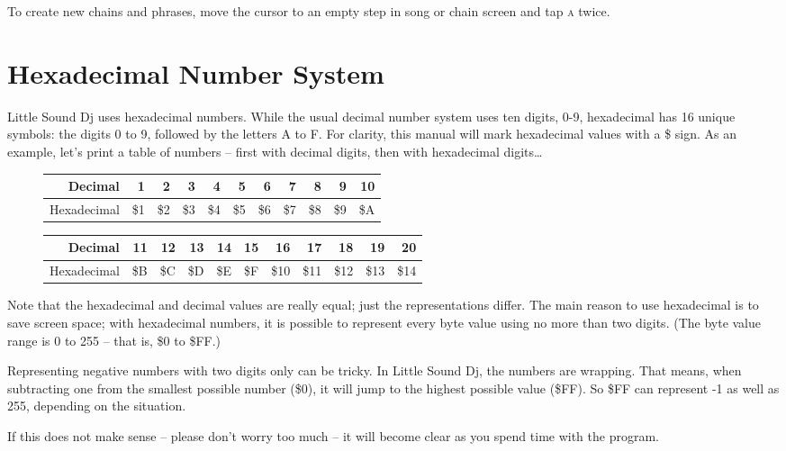 To create new chains and phrases, move the cursor to an empty step in song or chain screen and tap \textsc{a} twice.

\section{Hexadecimal Number System}

Little Sound Dj uses hexadecimal numbers. While the usual decimal number system uses ten digits, 0-9, hexadecimal has 16 unique symbols: the digits 0 to 9, followed by the letters A to F. For clarity, this manual will mark hexadecimal values with a \$ sign.
As an example, let's print a table of numbers -- first with decimal digits, then with
hexadecimal digits\ldots

\begin{figure}[hbtp]
\centering

\begin{tabular}{r|r|r|r|r|r|r|r|r|r|r}
 Decimal & 1 & 2 & 3 & 4 & 5 & 6 & 7 & 8 & 9 & 10 \\
\hline
 Hexadecimal & \$1 & \$2 & \$3 & \$4 & \$5 & \$6 & \$7 & \$8 & \$9 & \$A \\
\end{tabular}

\begin{tabular}{r|r|r|r|r|r|r|r|r|r|r}
 Decimal & 11 & 12 & 13 & 14 & 15 & 16 & 17 & 18 & 19 & 20 \\
\hline
 Hexadecimal & \$B & \$C & \$D & \$E & \$F & \$10 & \$11 & \$12 & \$13 & \$14  \\
\end{tabular}

\end{figure}

Note that the hexadecimal and decimal values are really equal; just the representations differ.
The main reason to use hexadecimal is to save screen space; with hexadecimal
numbers, it is possible to represent every byte value using no more than two digits. (The
byte value range is 0 to 255 -- that is, \$0 to \$FF.)

Representing negative numbers with two digits only can be tricky. In Little Sound Dj,
the numbers are wrapping. That means, when subtracting one from the smallest possible
number (\$0), it will jump to the highest possible value (\$FF). So \$FF can represent -1 as well as 255, depending on the situation.

If this does not make sense -- please don't worry too much -- it will become clear as you spend time with the program.

